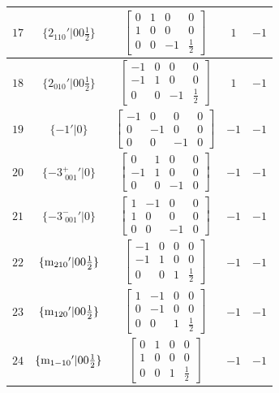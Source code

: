 \documentclass[fleqn,8pt]{jsarticle}
\begin{document}
\begin{longtable}{ccccc}
$ 17 $ & $ \{2{}_{110}{}'|0 0 \frac{1}{2}\} $ & $ \begin{bmatrix} 0 & 1 & 0 & 0 \\ 1 & 0 & 0 & 0 \\ 0 & 0 & -1 & \frac{1}{2} \end{bmatrix} $ & $ 1 $ & $ -1 $ \\ \hline
$ 18 $ & $ \{2{}_{010}{}'|0 0 \frac{1}{2}\} $ & $ \begin{bmatrix} -1 & 0 & 0 & 0 \\ -1 & 1 & 0 & 0 \\ 0 & 0 & -1 & \frac{1}{2} \end{bmatrix} $ & $ 1 $ & $ -1 $ \\ \hline
$ 19 $ & $ \{-1{}'|0\} $ & $ \begin{bmatrix} -1 & 0 & 0 & 0 \\ 0 & -1 & 0 & 0 \\ 0 & 0 & -1 & 0 \end{bmatrix} $ & $ -1 $ & $ -1 $ \\ \hline
$ 20 $ & $ \{-3^{+}_{\,\,001}{}'|0\} $ & $ \begin{bmatrix} 0 & 1 & 0 & 0 \\ -1 & 1 & 0 & 0 \\ 0 & 0 & -1 & 0 \end{bmatrix} $ & $ -1 $ & $ -1 $ \\ \hline
$ 21 $ & $ \{-3^{-}_{\,\,001}{}'|0\} $ & $ \begin{bmatrix} 1 & -1 & 0 & 0 \\ 1 & 0 & 0 & 0 \\ 0 & 0 & -1 & 0 \end{bmatrix} $ & $ -1 $ & $ -1 $ \\ \hline
$ 22 $ & $ \{{\rm m}_{210}{}'|0 0 \frac{1}{2}\} $ & $ \begin{bmatrix} -1 & 0 & 0 & 0 \\ -1 & 1 & 0 & 0 \\ 0 & 0 & 1 & \frac{1}{2} \end{bmatrix} $ & $ -1 $ & $ -1 $ \\ \hline
$ 23 $ & $ \{{\rm m}_{120}{}'|0 0 \frac{1}{2}\} $ & $ \begin{bmatrix} 1 & -1 & 0 & 0 \\ 0 & -1 & 0 & 0 \\ 0 & 0 & 1 & \frac{1}{2} \end{bmatrix} $ & $ -1 $ & $ -1 $ \\ \hline
$ 24 $ & $ \{{\rm m}_{1-10}{}'|0 0 \frac{1}{2}\} $ & $ \begin{bmatrix} 0 & 1 & 0 & 0 \\ 1 & 0 & 0 & 0 \\ 0 & 0 & 1 & \frac{1}{2} \end{bmatrix} $ & $ -1 $ & $ -1 $ \\
\end{longtable}
\end{document}
